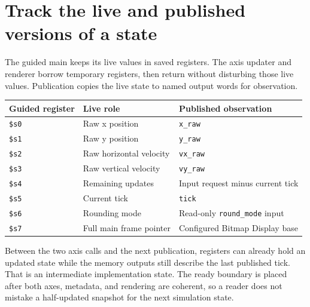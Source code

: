 \section{Track the live and published versions of a state}\label{ball-x-live-state}
The guided main keeps its live values in saved registers. The axis updater and
renderer borrow temporary registers, then return without disturbing those live
values. Publication copies the live state to named output words for observation.
\begin{longtable}{lll}
  \toprule
  Guided register & Live role               & Published observation                \\
  \midrule
  \texttt{\$s0}   & Raw x position          & \texttt{x\_raw}                      \\
  \texttt{\$s1}   & Raw y position          & \texttt{y\_raw}                      \\
  \texttt{\$s2}   & Raw horizontal velocity & \texttt{vx\_raw}                     \\
  \texttt{\$s3}   & Raw vertical velocity   & \texttt{vy\_raw}                     \\
  \texttt{\$s4}   & Remaining updates       & Input request minus current tick     \\
  \texttt{\$s5}   & Current tick            & \texttt{tick}                        \\
  \texttt{\$s6}   & Rounding mode           & Read-only \texttt{round\_mode} input \\
  \texttt{\$s7}   & Full main frame pointer & Configured Bitmap Display base       \\
  \bottomrule
\end{longtable}
Between the two axis calls and the next publication, registers can already hold
an updated state while the memory outputs still describe the last published tick.
That is an intermediate implementation state. The ready boundary is placed after
both axes, metadata, and rendering are coherent, so a reader does not mistake a
half-updated snapshot for the next simulation state.
